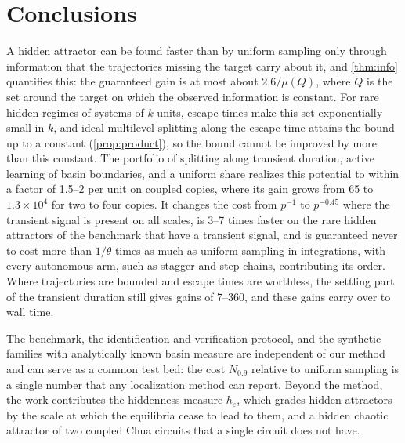 \section{Conclusions}\label{sec:conclusion}

A hidden attractor can be found faster than by uniform sampling only through information that the trajectories missing the target carry about it, and \cref{thm:info} quantifies this: the guaranteed gain is at most about $2.6/\mu(Q)$, where $Q$ is the set around the target on which the observed information is constant. For rare hidden regimes of systems of $k$ units, escape times make this set exponentially small in $k$, and ideal multilevel splitting along the escape time attains the bound up to a constant (\cref{prop:product}), so the bound cannot be improved by more than this constant. The portfolio of splitting along transient duration, active learning of basin boundaries, and a uniform share realizes this potential to within a factor of 1.5--2 per unit on coupled copies, where its gain grows from 65 to $1.3\times10^4$ for two to four copies. It changes the cost from $p^{-1}$ to $p^{-0.45}$ where the transient signal is present on all scales, is 3--7 times faster on the rare hidden attractors of the benchmark that have a transient signal, and is guaranteed never to cost more than $1/\theta$ times as much as uniform sampling in integrations, with every autonomous arm, such as stagger-and-step chains, contributing its order. Where trajectories are bounded and escape times are worthless, the settling part of the transient duration still gives gains of 7--360, and these gains carry over to wall time.

The benchmark, the identification and verification protocol, and the synthetic families with analytically known basin measure are independent of our method and can serve as a common test bed: the cost $N_{0.9}$ relative to uniform sampling is a single number that any localization method can report. Beyond the method, the work contributes the hiddenness measure $h_\varepsilon$, which grades hidden attractors by the scale at which the equilibria cease to lead to them, and a hidden chaotic attractor of two coupled Chua circuits that a single circuit does not have.
